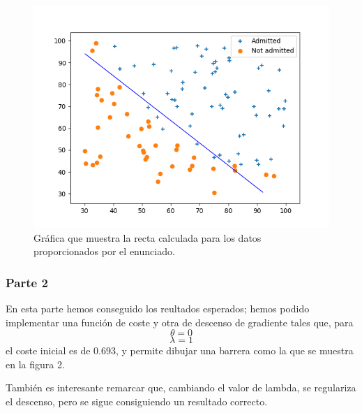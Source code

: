 \documentclass[11pt]{article}
\begin{document}
 \begin{figure}[h!]
    \begin{center}
    \includegraphics[width=\textwidth]{Imagenes/Recta.png}
    \caption{Gráfica que muestra la recta calculada para los datos proporcionados por el enunciado.}
    \label{fig:Gráfica que muestra la recta calculada para los datos proporcionados por el enunciado.}
    \end{center}
 \end{figure}

\subsubsection {Parte 2}

En esta parte hemos conseguido los reultados esperados; hemos podido implementar una función de coste y otra de descenso de gradiente tales que, para
 \begin{equation*}
    \theta = 0
  \end{equation*}
 \begin{equation*}
    \lambda = 1
  \end{equation*}
el coste inicial es de 0.693, y permite dibujar una barrera como la que se muestra en la figura 2.

También es interesante remarcar que, cambiando el valor de lambda, se regulariza el descenso, pero se sigue consiguiendo un resultado correcto.
\end{document}
